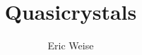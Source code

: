 \documentclass{article}
\title{Quasicrystals}
\author{Eric Weise}
\date{}
\begin{document}
\maketitle

\begin{abstract}
    
\end{abstract}


\begin{multicols}{2}

    
    
    
    
    

\end{multicols}

\printbibliography
\end{document}
